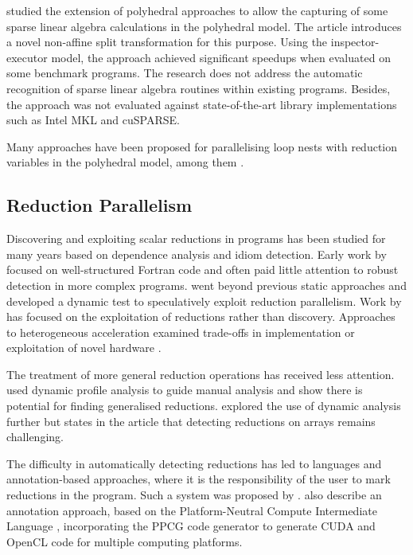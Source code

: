     \citet{Zhang:2016:CTG:3018843.3018849} studied the extension of polyhedral
    approaches to allow the capturing of some sparse linear algebra
    calculations in the polyhedral model.
    The article introduces a novel non-affine split transformation for this
    purpose.
    Using the inspector-executor model, the approach achieved significant
    speedups when evaluated on some benchmark programs.
    The research does not address the automatic recognition of sparse
    linear algebra routines within existing programs.
    Besides, the approach was not evaluated against state-of-the-art library
    implementations such as Intel MKL and cuSPARSE.

    Many approaches have been proposed for parallelising loop nests with
    reduction variables in the polyhedral model, among them
    \citet{jouvelot1989unified,redon1994scheduling,chi1997optimizing,
    gupta2006simplifying,stock2014framework}.

\subsection{Reduction Parallelism}

    Discovering and exploiting scalar reductions in programs has been studied
    for many years based on dependence analysis and idiom detection.
    Early work by
    \citet{pottenger1995idiom,suganuma1996detection,fisher1994parallelizing}
    focused on well-structured Fortran code and often paid little attention to
    robust detection in more complex programs.
    \citet{rauchwerger1999lrpd} went beyond previous static approaches and
    developed a dynamic test to speculatively exploit reduction parallelism.
    Work by
    \citet{Gutierrez:2000,gutierrez2003optimization,gutierrez2008analytical}
    has focused on the exploitation of reductions rather than discovery.
    Approaches to heterogeneous acceleration examined trade-offs in
    implementation \citep{yu2006adaptive} or exploitation of novel hardware
    \citep{ravi2010compiler,Huo2011HiPC}.

    The treatment of more general reduction operations has received less
    attention.
    \citet{das2010experiences} used dynamic profile analysis to guide
    manual analysis and show there is potential for finding generalised
    reductions.
    \citet{kim2012dynamic} explored the use of dynamic analysis further
    but states in the article that detecting reductions on arrays remains
    challenging.

    The difficulty in automatically detecting reductions has led to languages
    and annotation-based approaches, where it is the responsibility of the user
    to mark reductions in the program.
    Such a system was proposed by \citet{deitz2002high}.
    \citet{Reddy2016Reduction} also describe an annotation approach,
    based on the Platform-Neutral Compute Intermediate Language
    \citep{baghdadi2015PENCIL}, incorporating the PPCG code generator to
    generate CUDA and OpenCL code for multiple computing platforms.

